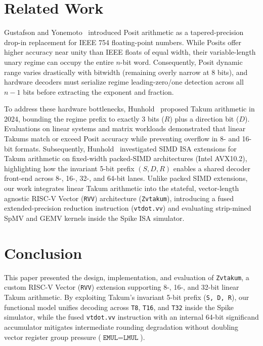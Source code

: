 \documentclass[conference]{IEEEtran}
\begin{document}
\section{Related Work}
\label{sec:related}

Gustafson and Yonemoto~\cite{gustafson2017posit} introduced Posit arithmetic as a tapered-precision drop-in replacement for IEEE 754 floating-point numbers. While Posits offer higher accuracy near unity than IEEE floats of equal width, their variable-length unary regime can occupy the entire $n$-bit word. Consequently, Posit dynamic range varies drastically with bitwidth (remaining overly narrow at 8 bits), and hardware decoders must serialize regime leading-zero/one detection across all $n - 1$ bits before extracting the exponent and fraction.

To address these hardware bottlenecks, Hunhold~\cite{hunhold2024takum} proposed Takum arithmetic in 2024, bounding the regime prefix to exactly 3 bits ($R$) plus a direction bit ($D$). Evaluations on linear systems and matrix workloads demonstrated that linear Takums match or exceed Posit accuracy while preventing overflow in 8- and 16-bit formats. Subsequently, Hunhold~\cite{hunhold2025avx} investigated SIMD ISA extensions for Takum arithmetic on fixed-width packed-SIMD architectures (Intel AVX10.2), highlighting how the invariant 5-bit prefix $(S, D, R)$ enables a shared decoder front-end across 8-, 16-, 32-, and 64-bit lanes. Unlike packed SIMD extensions, our work integrates linear Takum arithmetic into the stateful, vector-length agnostic RISC-V Vector (\texttt{RVV}) architecture (\texttt{Zvtakum}), introducing a fused extended-precision reduction instruction (\texttt{vtdot.vv}) and evaluating strip-mined SpMV and GEMV kernels inside the Spike ISA simulator.





\section{Conclusion}
\label{sec:conclusion}

This paper presented the design, implementation, and evaluation of \texttt{Zvtakum}, a custom RISC-V Vector (\texttt{RVV}) extension supporting 8-, 16-, and 32-bit linear Takum arithmetic. By exploiting Takum's invariant 5-bit prefix (\texttt{S, D, R}), our functional model unifies decoding across \texttt{T8}, \texttt{T16}, and \texttt{T32} inside the Spike simulator, while the fused \texttt{vtdot.vv} instruction with an internal 64-bit significand accumulator mitigates intermediate rounding degradation without doubling vector register group pressure ($\texttt{EMUL} = \texttt{LMUL}$).
\end{document}
